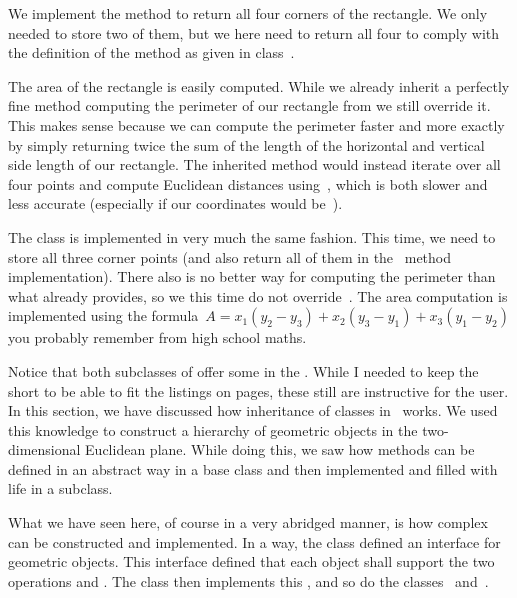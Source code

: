 We implement the method  to return all four corners of the rectangle.
We only needed to store two of them, but we here need to return all four to comply with the definition of the method as given in class~.

The area of the rectangle is easily computed.
While we already inherit a perfectly fine method  computing the perimeter of our rectangle from  we still override it.
This makes sense because we can compute the perimeter faster and more exactly by simply returning twice the sum of the length of the horizontal and vertical side length of our rectangle.
The inherited  method would instead iterate over all four points and compute Euclidean distances using~, which is both slower and less accurate (especially if our coordinates would be~).

The class  is implemented in very much the same fashion.
This time, we need to store all three corner points (and also return all of them in the ~method implementation).
There also is no better way for computing the perimeter than what  already provides, so we this time do not override~.
The area computation is implemented using the formula~$A=x_1(y_2-y_3)+x_2(y_3-y_1)+x_3(y_1-y_2)$ you probably remember from high school maths.

Notice that both subclasses of  offer some  in the .
While I needed to keep the  short to be able to fit the listings on pages, these  still are instructive for the user.%
\endhsection%
%
%
In this section, we have discussed how inheritance of classes in \python\ works.
We used this knowledge to construct a hierarchy of geometric objects in the two-dimensional Euclidean plane.
While doing this, we saw how methods can be defined in an abstract way in a base class and then implemented and filled with life in a subclass.

What we have seen here, of course in a very abridged manner, is how complex  can be constructed and implemented.
In a way, the class  defined an interface for geometric objects.
This interface defined that each object shall support the two operations  and .
The class  then implements this , and so do the classes~ and~.

